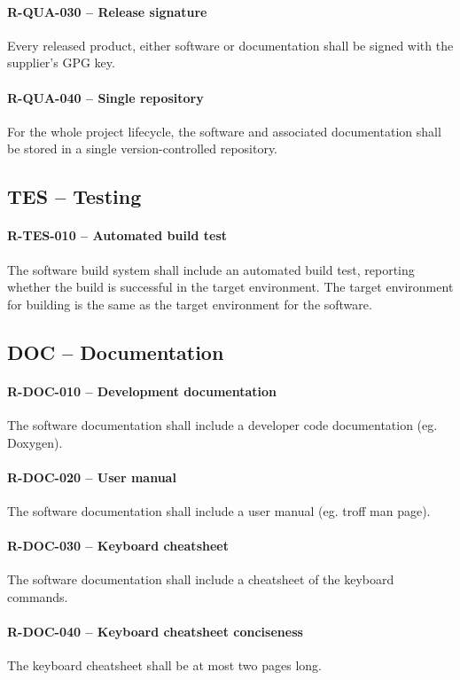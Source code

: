 \paragraph{R-QUA-030 -- Release signature}
Every released product, either software or documentation shall be signed
with the supplier's GPG key.

\paragraph{R-QUA-040 -- Single repository}
For the whole project lifecycle, the software and associated documentation shall
be stored in a single version-controlled repository.

\subsection{TES -- Testing}
\paragraph{R-TES-010 -- Automated build test}
The software build system shall include an automated build test, reporting
whether the build is successful in the target environment.
The target environment for building is the same as the target environment for
the software.

\subsection{DOC -- Documentation}
\paragraph{R-DOC-010 -- Development documentation}
The software documentation shall include a developer code documentation (eg.
Doxygen).

\paragraph{R-DOC-020 -- User manual}
The software documentation shall include a user manual (eg. troff man page).

\paragraph{R-DOC-030 -- Keyboard cheatsheet}
The software documentation shall include a cheatsheet of the keyboard commands.

\paragraph{R-DOC-040 -- Keyboard cheatsheet conciseness}
The keyboard cheatsheet shall be at most two pages long.

